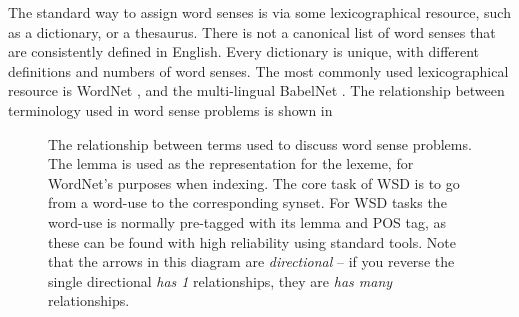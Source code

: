 \documentclass[12pt,parskip]{komatufte}
\begin{document}
The standard way to assign word senses is via some lexicographical resource, such as a dictionary, or a thesaurus.
There is not a canonical list of word senses that are consistently defined in English.
Every dictionary is unique, with different definitions and numbers of word senses.
The most commonly used lexicographical resource is WordNet , and the multi-lingual  BabelNet .
The relationship between terminology used in word sense problems is shown in 


\begin{figure}
	\caption{The relationship between terms used to discuss word sense problems.
		The lemma is used as the representation for the lexeme, for WordNet's purposes when indexing.
		The core task of WSD is to go from a word-use to the corresponding synset.
		For WSD tasks the word-use is normally pre-tagged with its lemma and POS tag,
		as these can be found with high reliability using standard tools.
		Note that the arrows in this diagram are \emph{directional} -- if you reverse the single directional \emph{has 1} relationships, they are \emph{has many} relationships.
	}
	\label{fig:wordsenseterms}

\end{figure}
\end{document}
